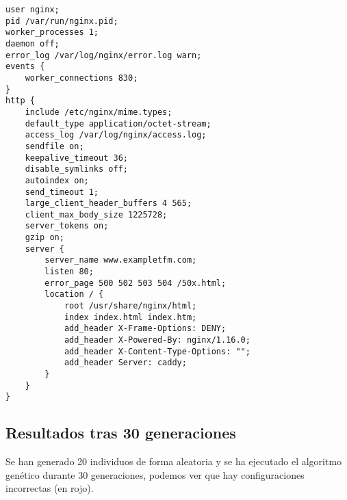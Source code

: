 \begin{lstlisting}[label={lst:nginx_config_random},caption={Configuración de NGINX tras 2 generaciones}]
user nginx;
pid /var/run/nginx.pid;
worker_processes 1;
daemon off;
error_log /var/log/nginx/error.log warn;
events {
    worker_connections 830;
}
http {
    include /etc/nginx/mime.types;
    default_type application/octet-stream;
    access_log /var/log/nginx/access.log;
    sendfile on;
    keepalive_timeout 36;
    disable_symlinks off;
    autoindex on;
    send_timeout 1;
    large_client_header_buffers 4 565;
    client_max_body_size 1225728;
    server_tokens on;
    gzip on;
    server {
        server_name www.exampletfm.com;
        listen 80;
        error_page 500 502 503 504 /50x.html;
        location / {
            root /usr/share/nginx/html;
            index index.html index.htm;
            add_header X-Frame-Options: DENY;
            add_header X-Powered-By: nginx/1.16.0;
            add_header X-Content-Type-Options: "";
            add_header Server: caddy;
        }
    }
}
\end{lstlisting}

\subsection{Resultados tras 30 generaciones}

Se han generado 20 individuos de forma aleatoria y se ha ejecutado el algoritmo genético durante 30 generaciones, podemos ver que hay configuraciones incorrectas (en rojo).

